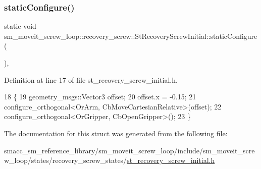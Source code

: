\subsubsection{\texorpdfstring{static\+Configure()}{staticConfigure()}}
{\footnotesize\ttfamily static void sm\+\_\+moveit\+\_\+screw\+\_\+loop\+::recovery\+\_\+screw\+::\+St\+Recovery\+Screw\+Initial\+::static\+Configure (\begin{DoxyParamCaption}{ }\end{DoxyParamCaption})\hspace{0.3cm}{\ttfamily [inline]}, {\ttfamily [static]}}



Definition at line 17 of file st\+\_\+recovery\+\_\+screw\+\_\+initial.\+h.


\begin{DoxyCode}
18             \{
19                 geometry\_msgs::Vector3 offset;
20                 offset.x = -0.15;
21                 configure\_orthogonal<OrArm, CbMoveCartesianRelative>(offset);
22                 configure\_orthogonal<OrGripper, CbOpenGripper>();
23             \}
\end{DoxyCode}


The documentation for this struct was generated from the following file\+:\begin{DoxyCompactItemize}
\item 
smacc\+\_\+sm\+\_\+reference\+\_\+library/sm\+\_\+moveit\+\_\+screw\+\_\+loop/include/sm\+\_\+moveit\+\_\+screw\+\_\+loop/states/recovery\+\_\+screw\+\_\+states/\hyperlink{st__recovery__screw__initial_8h}{st\+\_\+recovery\+\_\+screw\+\_\+initial.\+h}\end{DoxyCompactItemize}
